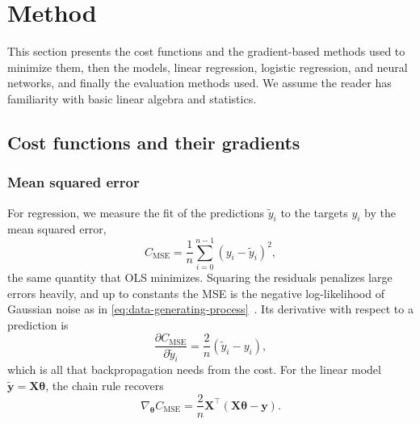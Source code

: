 \section{Method}
\label{sec:method}


This section presents the cost functions and the gradient-based methods used to
minimize them, then the models, linear regression, logistic regression, and neural
networks, and finally the evaluation methods used. We assume the reader has
familiarity with basic linear algebra and statistics.

\subsection{Cost functions and their gradients}\label{subsec:cost-functions}

\subsubsection{Mean squared error}
For regression, we measure the fit of the predictions $\tilde{y}_i$ to the targets
$y_i$ by the mean squared error,
\begin{equation}\label{eq:mse-cost}
    C_\text{MSE} = \frac{1}{n}\sum_{i=0}^{n-1}\left(y_i - \tilde{y}_i\right)^2,
\end{equation}
the same quantity that OLS minimizes. Squaring the
residuals penalizes large errors heavily, and up to constants the MSE is the negative
log-likelihood of Gaussian noise as in \cref{eq:data-generating-process}~\cite{goodfellow_2016}.
Its derivative with respect to a prediction is
\begin{equation}\label{eq:mse-gradient}
    \frac{\partial C_\text{MSE}}{\partial \tilde{y}_i} = \frac{2}{n}\left(\tilde{y}_i - y_i\right),
\end{equation}
which is all that backpropagation needs from the cost. For the linear model
$\tilde{\bm{y}} = \bm{X}\bm{\theta}$, the chain rule recovers
\begin{equation}\label{eq:ols-grad}
    \nabla_{\bm{\theta}} C_\text{MSE} =
    \frac{2}{n}\bm{X}^\top(\bm{X}\bm{\theta} - \bm{y}).
\end{equation}

